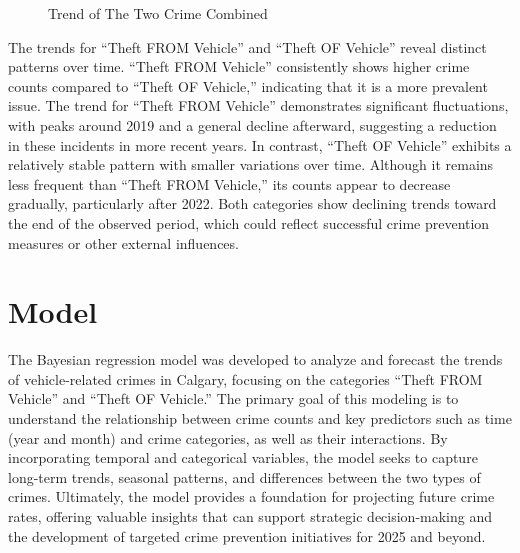 \documentclass[
  letterpaper,
  DIV=11,
  numbers=noendperiod]{scrartcl}
\begin{document}
\begin{figure}


\caption{\label{fig-combined-trend}Trend of The Two Crime Combined}

\end{figure}%

\newpage

The trends for ``Theft FROM Vehicle'' and ``Theft OF Vehicle'' reveal
distinct patterns over time. ``Theft FROM Vehicle'' consistently shows
higher crime counts compared to ``Theft OF Vehicle,'' indicating that it
is a more prevalent issue. The trend for ``Theft FROM Vehicle''
demonstrates significant fluctuations, with peaks around 2019 and a
general decline afterward, suggesting a reduction in these incidents in
more recent years. In contrast, ``Theft OF Vehicle'' exhibits a
relatively stable pattern with smaller variations over time. Although it
remains less frequent than ``Theft FROM Vehicle,'' its counts appear to
decrease gradually, particularly after 2022. Both categories show
declining trends toward the end of the observed period, which could
reflect successful crime prevention measures or other external
influences.

\section{Model}\label{model}

The Bayesian regression model was developed to analyze and forecast the
trends of vehicle-related crimes in Calgary, focusing on the categories
``Theft FROM Vehicle'' and ``Theft OF Vehicle.'' The primary goal of
this modeling is to understand the relationship between crime counts and
key predictors such as time (year and month) and crime categories, as
well as their interactions. By incorporating temporal and categorical
variables, the model seeks to capture long-term trends, seasonal
patterns, and differences between the two types of crimes. Ultimately,
the model provides a foundation for projecting future crime rates,
offering valuable insights that can support strategic decision-making
and the development of targeted crime prevention initiatives for 2025
and beyond.
\end{document}
